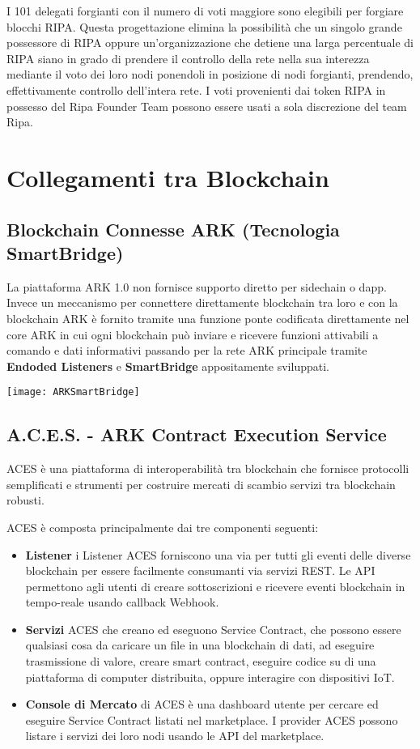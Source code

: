 \documentclass[11pt,fleqn]{book} %
\begin{document}
I 101 delegati forgianti con il numero di voti maggiore sono elegibili per forgiare blocchi
RIPA. Questa progettazione elimina la possibilità che un singolo grande possessore di
RIPA oppure un'organizzazione che detiene una larga percentuale di RIPA siano in grado
di prendere il controllo della rete nella sua interezza mediante il voto dei loro nodi
ponendoli in posizione di nodi forgianti, prendendo, effettivamente controllo dell'intera rete. 
I voti provenienti dai token RIPA in possesso del Ripa Founder Team
possono essere usati a sola discrezione del team Ripa.

\section{Collegamenti tra Blockchain}
\subsection{Blockchain Connesse ARK (Tecnologia SmartBridge)}
La piattaforma ARK 1.0 non fornisce supporto diretto per sidechain o dapp. Invece
un meccanismo per connettere direttamente blockchain tra loro e con la blockchain ARK
è fornito tramite una funzione ponte codificata direttamente nel core ARK in cui
ogni blockchain può inviare e ricevere funzioni attivabili a comando e dati
informativi passando per la rete ARK principale tramite \textbf{Endoded Listeners}
e \textbf{SmartBridge} appositamente sviluppati.
\begin{center}
	\texttt{[image: ARKSmartBridge]}
\end{center}

\subsection{A.C.E.S. - ARK Contract Execution Service}
ACES è una piattaforma di interoperabilità tra blockchain che fornisce protocolli semplificati
e strumenti per costruire mercati di scambio servizi tra blockchain robusti.

ACES è composta principalmente dai tre componenti seguenti:
\begin{itemize}
	\item \textbf{Listener} i Listener ACES forniscono una via per tutti gli eventi delle diverse
	blockchain per essere facilmente consumanti via servizi REST. Le API permettono agli utenti
	di creare sottoscrizioni e ricevere eventi blockchain in tempo-reale usando callback Webhook.
	\item \textbf{Servizi} ACES che creano ed eseguono Service Contract, che possono essere qualsiasi
	cosa da caricare un file in una blockchain di dati, ad eseguire trasmissione di valore,
	creare smart contract, eseguire codice su di una piattaforma di computer distribuita, oppure
	interagire con dispositivi IoT.
	\item \textbf{Console di Mercato} di ACES è una dashboard utente per cercare ed eseguire Service
	Contract listati nel marketplace. I provider ACES possono listare i servizi dei loro nodi 
	usando le API del marketplace.
\end{itemize}
\end{document}
